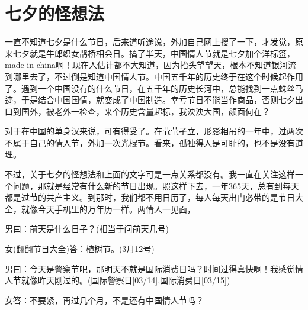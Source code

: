 \newpage
\section*{七夕的怪想法}

一直不知道七夕是什么节日，后来道听途说，外加自己网上搜了一下，才发觉，原来七夕就是牛郎织女鹊桥相会日。搞了半天，中国情人节就是七夕加个洋标签，made in china啊！现在人估计都不大知道，因为抬头望望天，根本不知道银河流到哪里去了，不过倒是知道中国情人节。中国五千年的历史终于在这个时候起作用了。遇到一个中国没有的什么节日，在五千年的历史长河中，总能找到一点蛛丝马迹，于是结合中国国情，就变成了中国制造。幸亏节日不能当作商品，否则七夕出口到国外，被老外一检查，来个历史含量超标，我泱泱大国，颜面何在？

对于在中国的单身汉来说，可有得受了。在茕茕孑立，形影相吊的一年中，过两次不属于自己的情人节，外加一次光棍节。看来，孤独得人是可耻的，也不是没有道理。

不过，关于七夕的怪想法和上面的文字可是一点关系都没有。我一直在关注这样一个问题，那就是经常有什么新的节日出现。照这样下去，一年365天，总有到每天都是过节的共产主义。到那时，我们都不用日历了，每人每天出门必带的是节日大全，就像今天手机里的万年历一样。两情人一见面，

男曰：前天是什么日子？(相当于问前天几号)

女(翻翻节日大全)答：植树节。(3月12号)

男曰：今天是警察节吧，那明天不就是国际消费日吗？时间过得真快啊！我感觉情人节就像昨天刚过的。(国际警察日[03/14],国际消费日[03/15])

女答：不要紧，再过几个月，不是还有中国情人节吗？
